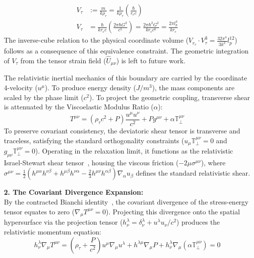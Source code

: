 \begin{align}
    V_\tau &:= \frac{m}{k\rho_\tau} = \frac{1}{k\rho_\tau} \left( \frac{\hbar}{r_c c} \right) \nonumber \\ 
    V_\tau &= \frac{\hbar}{k r_c c} \left( \frac{2\pi\hbar G^2}{c^5} \right) = \frac{2\pi \hbar^2 G^2}{k r_c c^6} = \frac{2\pi l_p^4}{k r_c} 
\end{align}
The inverse-cube relation to the physical coordinate volume ($V_{r_c} \cdot V_\tau^3 = \frac{32\pi^4}{3k^3} l_p^{12}$) follows as a consequence of this equivalence constraint. The geometric integration of $V_\tau$ from the tensor strain field ($\hat{U}_{\mu\nu}$) is left to future work. 

The relativistic inertial mechanics of this boundary are carried by the coordinate 4-velocity ($u^\mu$). To produce energy density ($J/m^3$), the mass components are scaled by the phase limit ($c^2$). To project the geometric coupling, transverse shear is attenuated by the Viscoelastic Modulus Ratio ($\alpha$):
\begin{equation}
    T^{\mu\nu} = \left(\rho_\tau c^2 + P\right)\frac{u^\mu u^\nu}{c^2} + P g^{\mu\nu} + \alpha \mathbb{T}_{\perp}^{\mu\nu}
\end{equation}
To preserve covariant consistency, the deviatoric shear tensor is transverse and traceless, satisfying the standard orthogonality constraints ($u_\mu \mathbb{T}_{\perp}^{\mu\nu} = 0$ and $g_{\mu\nu}\mathbb{T}_{\perp}^{\mu\nu} = 0$). Operating in the relaxation limit, it functions as the relativistic Israel-Stewart shear tensor~\cite{Israel1979}, housing the viscous friction ($-2\mu\sigma^{\mu\nu}$), where $\sigma^{\mu\nu} = \frac{1}{2}(h^{\mu\alpha}h^{\nu\beta} + h^{\mu\beta}h^{\nu\alpha} - \frac{2}{3}h^{\mu\nu}h^{\alpha\beta})\nabla_\alpha u_\beta$ defines the standard relativistic shear.

\vspace{0.2 cm}

\textbf{2. The Covariant Divergence Expansion:} \\
By the contracted Bianchi identity~\cite{Bianchi1892}, the covariant divergence of the stress-energy tensor equates to zero ($\nabla_\mu T^{\mu\nu} = 0$). Projecting this divergence onto the spatial hypersurface via the projection tensor ($h^\lambda_\nu = \delta^\lambda_\nu + u^\lambda u_\nu / c^2$) produces the relativistic momentum equation:
\begin{equation}
    h^\lambda_\nu \nabla_\mu T^{\mu\nu} = \left(\rho_\tau + \frac{P}{c^2}\right) u^\mu \nabla_\mu u^\lambda + h^{\lambda\mu} \nabla_\mu P + h^\lambda_\nu \nabla_\mu (\alpha \mathbb{T}_{\perp}^{\mu\nu}) = 0
\end{equation}

